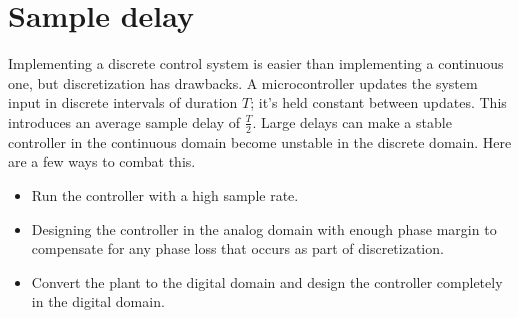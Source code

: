 \section{Sample delay}

Implementing a discrete control system is easier than implementing a continuous
one, but \gls{discretization} has drawbacks. A microcontroller updates the
system input in discrete intervals of duration $T$; it's held constant between
updates. This introduces an average sample delay of $\frac{T}{2}$. Large delays
can make a stable controller in the continuous domain become unstable in the
discrete domain. Here are a few ways to combat this.
\begin{itemize}
  \item Run the controller with a high sample rate.
  \item Designing the controller in the analog domain with enough
    \gls{phase margin} to compensate for any phase loss that occurs as part of
    \gls{discretization}.
  \item Convert the \gls{plant} to the digital domain and design the controller
    completely in the digital domain.
\end{itemize}
